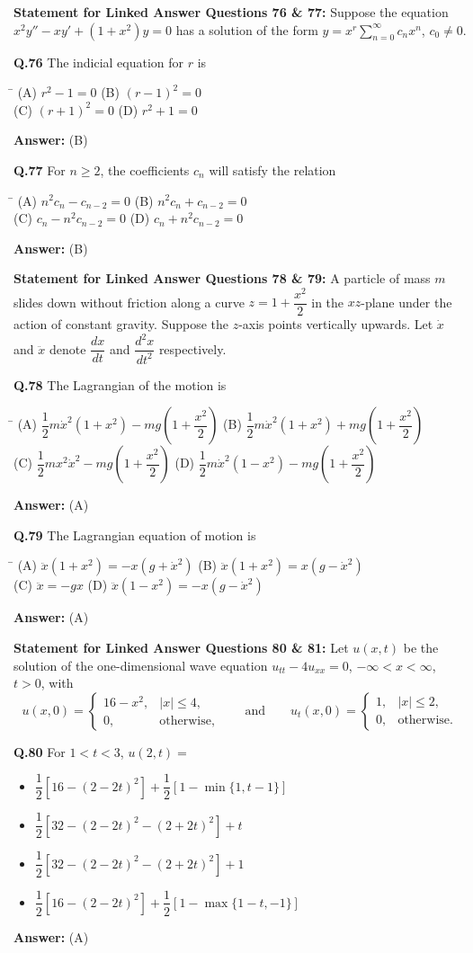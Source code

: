 \documentclass[11pt,a4paper]{article}
\newcommand{\optsfourA}[4]{%
  \begin{tabbing}
    \hspace{0.48\linewidth}\=\kill
    (A) #1 \> (B) #2 \\[2pt]
    (C) #3 \> (D) #4
  \end{tabbing}%
}
\newcommand{\optslistA}[4]{%
  \begin{itemize}
    \setlength{\itemsep}{2pt}\setlength{\parskip}{0pt}
    \item[(A)] #1
    \item[(B)] #2
    \item[(C)] #3
    \item[(D)] #4
  \end{itemize}%
}
\newcommand{\ans}[1]{\textbf{Answer:} #1\par\medskip}
\begin{document}
\textbf{Statement for Linked Answer Questions 76 \& 77:}
Suppose the equation $x^2 y'' - xy' + (1 + x^2)y = 0$ has a solution of the form $y = x^r \displaystyle\sum_{n=0}^{\infty} c_n x^n$, $c_0 \ne 0$.

\textbf{Q.76} The indicial equation for $r$ is
\optsfourA{$r^2 - 1 = 0$}{$(r - 1)^2 = 0$}{$(r + 1)^2 = 0$}{$r^2 + 1 = 0$}
\ans{(B)}

\textbf{Q.77} For $n \ge 2$, the coefficients $c_n$ will satisfy the relation
\optsfourA{$n^2 c_n - c_{n-2} = 0$}{$n^2 c_n + c_{n-2} = 0$}{$c_n - n^2 c_{n-2} = 0$}{$c_n + n^2 c_{n-2} = 0$}
\ans{(B)}

\medskip
\textbf{Statement for Linked Answer Questions 78 \& 79:}
A particle of mass $m$ slides down without friction along a curve $z = 1 + \dfrac{x^2}{2}$ in the $xz$-plane under the action of constant gravity. Suppose the $z$-axis points vertically upwards. Let $\dot{x}$ and $\ddot{x}$ denote $\dfrac{dx}{dt}$ and $\dfrac{d^2 x}{dt^2}$ respectively.

\textbf{Q.78} The Lagrangian of the motion is
\optsfourA{$\dfrac{1}{2}m\dot{x}^2(1 + x^2) - mg\!\left(1 + \dfrac{x^2}{2}\right)$}{$\dfrac{1}{2}m\dot{x}^2(1 + x^2) + mg\!\left(1 + \dfrac{x^2}{2}\right)$}{$\dfrac{1}{2}m x^2 \dot{x}^2 - mg\!\left(1 + \dfrac{x^2}{2}\right)$}{$\dfrac{1}{2}m\dot{x}^2(1 - x^2) - mg\!\left(1 + \dfrac{x^2}{2}\right)$}
\ans{(A)}

\textbf{Q.79} The Lagrangian equation of motion is
\optsfourA{$\ddot{x}(1 + x^2) = -x(g + \dot{x}^2)$}{$\ddot{x}(1 + x^2) = x(g - \dot{x}^2)$}{$\ddot{x} = -gx$}{$\ddot{x}(1 - x^2) = -x(g - \dot{x}^2)$}
\ans{(A)}

\medskip
\textbf{Statement for Linked Answer Questions 80 \& 81:}
Let $u(x, t)$ be the solution of the one-dimensional wave equation $u_{tt} - 4u_{xx} = 0$, $-\infty < x < \infty$, $t > 0$, with
\[
  u(x, 0) = \begin{cases} 16 - x^2, & |x| \le 4, \\ 0, & \text{otherwise,} \end{cases}
  \qquad \text{and} \qquad
  u_t(x, 0) = \begin{cases} 1, & |x| \le 2, \\ 0, & \text{otherwise.} \end{cases}
\]

\textbf{Q.80} For $1 < t < 3$, $u(2, t) =$
\optslistA{$\dfrac{1}{2}[16 - (2 - 2t)^2] + \dfrac{1}{2}[1 - \min\{1, t - 1\}]$}{$\dfrac{1}{2}[32 - (2 - 2t)^2 - (2 + 2t)^2] + t$}{$\dfrac{1}{2}[32 - (2 - 2t)^2 - (2 + 2t)^2] + 1$}{$\dfrac{1}{2}[16 - (2 - 2t)^2] + \dfrac{1}{2}[1 - \max\{1 - t, -1\}]$}
\ans{(A)}
\end{document}
